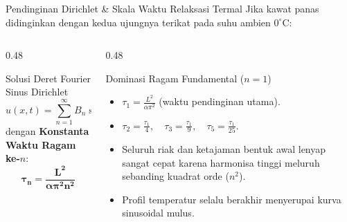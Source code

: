 \documentclass[aspectratio=169,10pt]{beamer}
\begin{document}
\begin{frame}{Pendinginan Dirichlet \& Skala Waktu Relaksasi Termal}
  Jika kawat panas didinginkan dengan kedua ujungnya terikat pada suhu ambien $0^\circ\text{C}$:
  \begin{columns}[t]
    \begin{column}{0.48\textwidth}
      \begin{block}{Solusi Deret Fourier Sinus Dirichlet}
        \small
        \begin{equation*}
          u(x, t) = \sum_{n=1}^{\infty} B_n \sin\left(\frac{n\pi x}{L}\right) \exp\left(-\frac{t}{\tau_n}\right)
        \end{equation*}
        dengan \textbf{Konstanta Waktu Ragam ke-$n$}:
        \begin{equation*}
          \mathbf{\tau_n = \frac{L^2}{\alpha \pi^2 n^2}}
        \end{equation*}
      \end{block}
    \end{column}
    \begin{column}{0.48\textwidth}
      \begin{alertblock}{Dominasi Ragam Fundamental ($n = 1$)}
        \small
        \begin{itemize}
          \item $\tau_1 = \frac{L^2}{\alpha \pi^2}$ (waktu pendinginan utama).
          \item $\tau_2 = \frac{\tau_1}{4}, \quad \tau_3 = \frac{\tau_1}{9}, \quad \tau_5 = \frac{\tau_1}{25}$.
          \item Seluruh riak dan ketajaman bentuk awal lenyap sangat cepat karena harmonisa tinggi meluruh sebanding kuadrat orde ($n^2$).
          \item Profil temperatur selalu berakhir menyerupai kurva sinusoidal mulus.
        \end{itemize}
      \end{alertblock}
    \end{column}
  \end{columns}
\end{frame}
\end{document}
